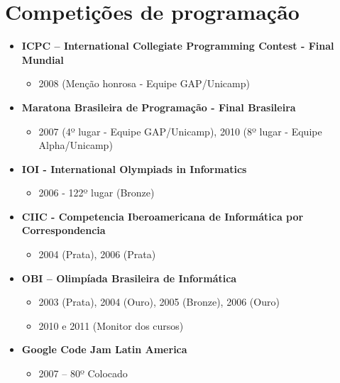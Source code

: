 \documentclass[a4paper,10pt]{article}
\begin{document}
  \section{Competições de programação}
    \begin{itemize}
      \item 
        \textbf{ICPC – International Collegiate Programming Contest - Final Mundial}
        \begin{itemize}
          \item 2008 (Menção honrosa - Equipe GAP/Unicamp)
        \end{itemize}
      \item 
        \textbf{Maratona Brasileira de Programação - Final Brasileira}
        \begin{itemize}
          \item 2007 (4º lugar - Equipe GAP/Unicamp), 2010 (8º lugar - Equipe Alpha/Unicamp)
        \end{itemize}
      \item 
        \textbf{IOI - International Olympiads in Informatics}
        \begin{itemize}
          \item 2006 - 122º lugar (Bronze)
        \end{itemize}
      \item 
        \textbf{CIIC - Competencia Iberoamericana de Informática por Correspondencia}
        \begin{itemize}
          \item 2004 (Prata), 2006 (Prata)
        \end{itemize}
      \item 
        \textbf{OBI – Olimpíada Brasileira de Informática}
        \begin{itemize}
          \item 2003 (Prata), 2004 (Ouro), 2005 (Bronze), 2006 (Ouro)
          \item 2010 e 2011 (Monitor dos cursos)
        \end{itemize}
      \item 
        \textbf{Google Code Jam Latin America}
        \begin{itemize}
          \item 2007 – 80º Colocado
        \end{itemize}
    \end{itemize}
% 
\end{document}
